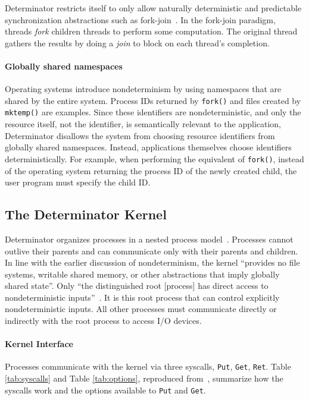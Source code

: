 Determinator restricts itself to only allow naturally deterministic and
predictable synchronization abstractions such as
fork-join~\cite{nelson1988approximate}. In the fork-join paradigm, threads
\emph{fork} children threads to perform some computation. The original thread
gathers the results by doing a \emph{join} to block on each thread's completion.

\paragraph{Globally shared namespaces}
Operating systems introduce nondeterminism by using namespaces that are shared
by the entire system. Process IDs returned by {\tt fork()} and files created
by {\tt mktemp()} are examples. Since these identifiers are nondeterministic,
and only the resource itself, not the identifier, is semantically relevant to
the application, Determinator disallows the system from choosing resource
identifiers from globally shared namespaces. Instead, applications themselves
choose identifiers deterministically. For example, when performing the
equivalent of {\tt fork()}, instead of the operating system returning the
process ID of the newly created child, the user program must specify the child
ID.

\subsection{The Determinator Kernel}

Determinator organizes processes in a nested process
model~\cite{Ford96,Aviram10}.
Processes cannot outlive their parents and can communicate only with their
parents and children. In line with the earlier discussion of nondeterminism,
the kernel ``provides no file systems, writable shared memory, or other
abstractions that imply globally shared state''. Only ``the
distinguished root [process] has direct access to nondeterministic
inputs''~\cite{Aviram10}. It is this root process that can control explicitly
nondeterministic inputs. All other processes must communicate
directly or indirectly with the root process to access I/O devices.




\paragraph{Kernel Interface} Processes communicate with the kernel via three
syscalls, {\tt Put}, {\tt Get}, {\tt Ret}. Table \ref{tab:syscalls} and Table
\ref{tab:options}, reproduced from~\cite{Aviram10}, summarize how the syscalls
work and the options available to {\tt Put} and {\tt Get}.

